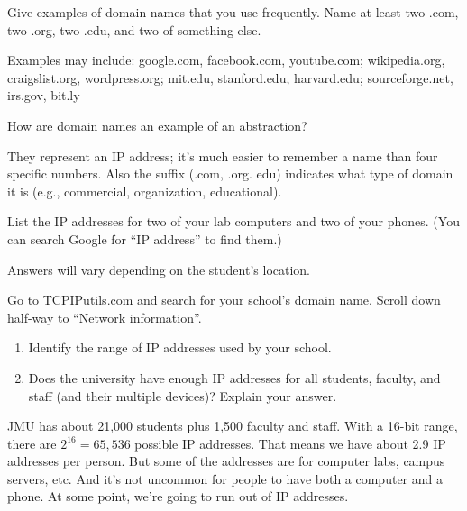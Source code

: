 \Q Give examples of domain names that you use frequently.
Name at least two .com, two .org, two .edu, and two of something else.

\begin{answer}
Examples may include:
google.com, facebook.com, youtube.com;
wikipedia.org, craigslist.org, wordpress.org;
mit.edu, stanford.edu, harvard.edu;
sourceforge.net, irs.gov, bit.ly
\end{answer}


\Q How are domain names an example of an abstraction?

\begin{answer}
They represent an IP address; it's much easier to remember a name than four specific numbers.
Also the suffix (.com, .org. edu) indicates what type of domain it is (e.g., commercial, organization, educational).
\end{answer}


\Q List the IP addresses for two of your lab computers and two of your phones.
(You can search Google for ``IP address'' to find them.)

\begin{answer}
Answers will vary depending on the student's location.
\end{answer}


\Q Go to \href{http://www.tcpiputils.com/}{TCPIPutils.com} and search for your school's domain name.
Scroll down half-way to ``Network information''.
\begin{enumerate}
\item Identify the range of IP addresses used by your school. 
\item Does the university have enough IP addresses for all students, faculty, and staff (and their multiple devices)? Explain your answer.
\end{enumerate}

\vspace{-1em}

\begin{answer}[5em]
JMU has about 21,000 students plus 1,500 faculty and staff.
With a 16-bit range, there are $2^{16} = 65,536$ possible IP addresses.
That means we have about 2.9 IP addresses per person.
But some of the addresses are for computer labs, campus servers, etc.
And it's not uncommon for people to have both a computer and a phone.
At some point, we're going to run out of IP addresses.
\end{answer}

